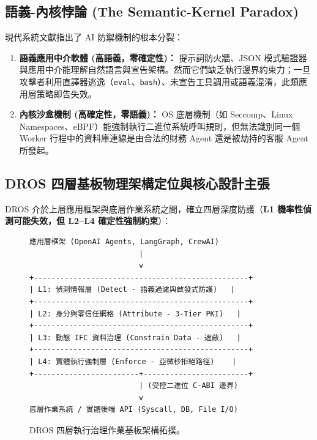 \documentclass[conference]{IEEEtran}
\begin{document}
\subsection{語義-內核悖論 (The Semantic-Kernel Paradox)}
現代系統文獻指出了 AI 防禦機制的根本分裂：
\begin{enumerate}
    \item \textbf{語義應用中介軟體 (高語義，零確定性)：} 提示詞防火牆、JSON 模式驗證器與應用中介能理解自然語言與宣告架構。然而它們缺乏執行邊界約束力；一旦攻擊者利用直譯器逃逸（\texttt{eval}、\texttt{bash}）、未宣告工具調用或語義混淆，此類應用層策略即告失效。
    \item \textbf{內核沙盒機制 (高確定性，零語義)：} OS 底層機制（如 Seccomp、Linux Namespaces、eBPF）能強制執行二進位系統呼叫規則，但無法識別同一個 Worker 行程中的資料庫連線是由合法的財務 Agent 還是被劫持的客服 Agent 所發起。
\end{enumerate}

\subsection{DROS 四層基板物理架構定位與核心設計主張}
DROS 介於上層應用框架與底層作業系統之間，確立四層深度防護（\textbf{L1 機率性偵測可能失效，但 L2--L4 確定性強制約束}）：

\begin{figure}[!t]
\centering
\begin{minipage}{0.95\columnwidth}
\footnotesize
\begin{verbatim}
應用層框架 (OpenAI Agents, LangGraph, CrewAI)
                         |
                         v
+-------------------------------------------------+
| L1: 偵測情報層 (Detect - 語義過濾與啟發式防護)   |
+-------------------------------------------------+
| L2: 身分與零信任網格 (Attribute - 3-Tier PKI)   |
+-------------------------------------------------+
| L3: 動態 IFC 資料治理 (Constrain Data - 遮蔽)   |
+-------------------------------------------------+
| L4: 實體執行強制層 (Enforce - 亞微秒拒絕路徑)    |
+------------------------+------------------------+
                         | (受控二進位 C-ABI 邊界)
                         v
底層作業系統 / 實體後端 API (Syscall, DB, File I/O)
\end{verbatim}
\end{minipage}
\caption{DROS 四層執行治理作業基板架構拓撲。}
\label{fig:dros_topology_zh}
\end{figure}
\end{document}
